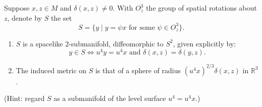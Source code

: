 Suppose $x, z \in M$ and $\delta(x, z) \neq 0$. With $O_z^3$ the group of spatial rotations about $z$, denote by $S$ the set
$$
S = \{ y \mid y = \psi x \text{ for some } \psi \in O_z^3 \}.
$$
\begin{enumerate}
  \item[(a)] $S$ is a spacelike $2$-submanifold, diffeomorphic to $S^2$, given explicitly by:
  $$
  y \in S \iff u^4 y = u^4 x \text{ and } \delta(x, z) = \delta(y, z).
  $$
  \item[(b)] The induced metric on $S$ is that of a sphere of radius $(u^4 x)^{2/3} \delta(x, z)$ in $\mathbb{R}^3$.
\end{enumerate}
(Hint: regard $S$ as a submanifold of the level surface $u^4 = u^4 x$.)

